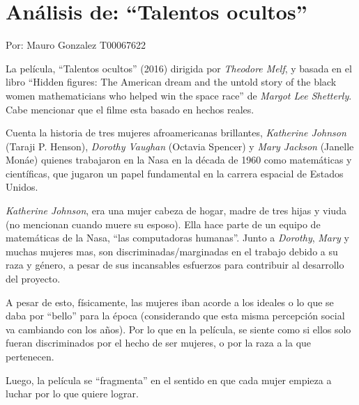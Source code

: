 \documentclass[letterpaper, 12pt]{report}
\begin{document}
\chapter*{Análisis de: ``Talentos ocultos''}

\noindent\makebox[\linewidth]{\rule{\textwidth}{0.4pt}}

Por: Mauro Gonzalez T00067622

\noindent\makebox[\linewidth]{\rule{\textwidth}{0.4pt}}

\nocite{Pelicula}


La película, ``Talentos ocultos'' (2016) dirigida por
\textit{Theodore Melf}, y basada en el libro ``Hidden
figures: The American dream and the untold story of the
black women mathematicians who helped win the space race''
de \textit{Margot Lee Shetterly}. Cabe mencionar que el
filme esta basado en hechos reales.

Cuenta la historia de tres mujeres afroamericanas
brillantes, \textit{Katherine Johnson} (Taraji P. Henson),
\textit{Dorothy Vaughan} (Octavia Spencer) y \textit{Mary
    Jackson} (Janelle Monáe) quienes trabajaron en la Nasa en
la década de 1960 como matemáticas y científicas, que
jugaron un papel fundamental en la carrera espacial de
Estados Unidos.

\textit{Katherine Johnson}, era una mujer cabeza de hogar, madre de tres
hijas y viuda (no mencionan cuando muere su esposo). Ella hace parte de un
equipo de matemáticas de la Nasa, ``las computadoras humanas''. Junto a
\textit{Dorothy}, \textit{Mary} y muchas mujeres mas, son
discriminadas/marginadas en el trabajo debido a su raza y género, a pesar de
sus incansables esfuerzos para contribuir al desarrollo del proyecto.

A pesar de esto, físicamente, las mujeres iban acorde a los
ideales o lo que se daba por ``bello'' para la época
(considerando que esta misma percepción social va cambiando
con los años). Por lo que en la película, se siente como si
ellos solo fueran discriminados por el hecho de ser
mujeres, o por la raza a la que pertenecen.

Luego, la película se ``fragmenta'' en el sentido en que
cada mujer empieza a luchar por lo que quiere lograr.
\end{document}
